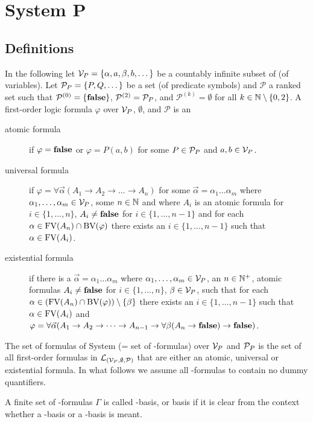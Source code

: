 \section{System P}\label{sec.3}
\subsection{Definitions}
In the following let $\mathcal{V}_P=\{\alpha,a,\beta,b,\dots\}$ be a countably infinite subset of \lambdaTypVar{} (of variables). 
Let $\mathcal{P}_P=\{P,Q,\dots\}$ be a set (of predicate symbols) and $\mathcal{P}$ a ranked set such that $\mathcal{P}^{(0)}=\{\textbf{false}\}$, $\mathcal{P}^{(2)}=\mathcal{P}_P$, and $\mathcal{P}^{(k)}=\emptyset$ for all $k\in\mathbb{N}\setminus\{0,2\}$.
A first-order logic formula $\varphi$ over $\mathcal{V}_P$, $\emptyset$, and $\mathcal{P}$ is an
\begin{description} %
	\item[atomic formula] if $\varphi=\textbf{false}$ or $\varphi=P(a,b)$ for some $P\in\mathcal{P}_P$ and $a,b\in\mathcal{V}_P$.
	\item[universal formula] if $\varphi=\forall\vec{\alpha}(A_1\to A_2 \to\dots\to A_n)$ for some $\vec{\alpha}=\alpha_1\dots\alpha_m$ where $\alpha_1,\dots,\alpha_m\in\mathcal{V}_P$, some $n\in\mathbb{N}$ and where $A_i$ is an atomic formula for $i\in\{1,\dots,n\}$, $A_i\neq\textbf{false}$ for $i\in\{1,\dots,n-1\}$ and for each $\alpha\in\text{FV}(A_n)\cap\text{BV}(\varphi)$ %
	 there exists an $i\in\{1,\dots,n-1\}$ such that $\alpha\in\text{FV}(A_i)$.
	\item[existential formula] if there is a $\vec{\alpha}=\alpha_1\dots\alpha_m$ where $\alpha_1,\dots,\alpha_m\in\mathcal{V}_P$, an $n\in\mathbb{N}^+$, atomic formulas $A_i\neq\textbf{false}$ for $i\in\{1,\dots,n\}$, $\beta\in\mathcal{V}_P$, such that for each $\alpha\in(\text{FV}(A_n)\cap\text{BV}(\varphi))\setminus\{\beta\}$ there exists an $i\in\{1,\dots,n-1\}$ such that $\alpha\in\text{FV}(A_i)$ and $\varphi=\forall\vec{\alpha}(A_1\to A_2 \to\dots\to A_{n-1}\to\forall\beta(A_n\to\textbf{false})\to\textbf{false})$.
\end{description}
The set of formulas of System \SysP{} (= set of \SysP-formulas) over $\mathcal{V}_P$ and $\mathcal{P}_P$ is the set of all first-order formulas in $\mathcal{L}_{(\mathcal{V}_P,\emptyset,\mathcal{P})}$ that are either an atomic, universal or existential formula. In what follows we assume all \SysP-formulas to contain no dummy quantifiers.

\begin{definition}\label{def.3.1}
A finite set of \SysP-formulas $\Gamma$ is called \SysP-basis, or basis if it is clear from the context whether a \SysP-basis or a \lambdaTwo-basis is meant.
\end{definition}

